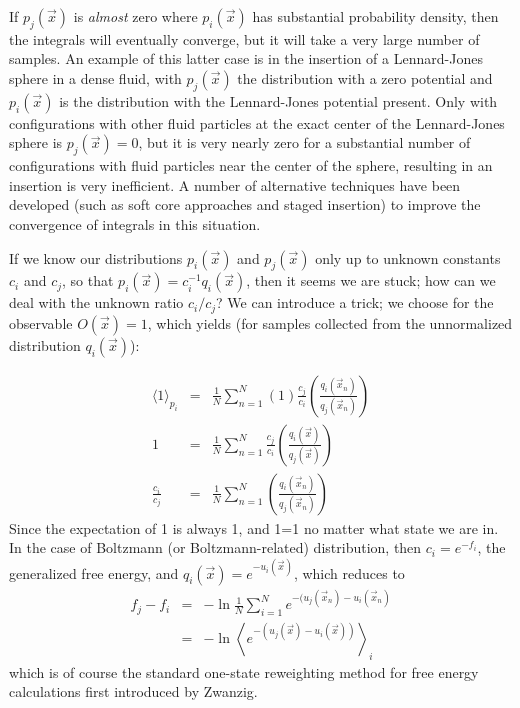 \documentclass[aps,pre,twocolumn,superscriptaddress]{revtex4-1}
\newcommand{\expect}[1]{\left \langle #1 \right \rangle} %
\begin{document}
If $p_j(\vec{x})$ is {\em almost} zero where
$p_i(\vec{x})$ has substantial probability density, then the integrals
will eventually converge, but it will take a very large number of
samples. An example of this latter case is in the insertion of a
Lennard-Jones sphere in a dense fluid, with $p_j(\vec{x})$ the
distribution with a zero potential and $p_i(\vec{x})$ is the
distribution with the Lennard-Jones potential present.  Only with
configurations with other fluid particles at the exact center of the
Lennard-Jones sphere is $p_j(\vec{x})=0$, but it is very nearly zero
for a substantial number of configurations with fluid particles near
the center of the sphere, resulting in an insertion is very
inefficient.  A number of alternative techniques have been developed
(such as soft core approaches and staged insertion) to improve the
convergence of integrals in this situation.


If we know our distributions $p_i(\vec{x})$ and $p_j(\vec{x})$ only up
to unknown constants $c_i$ and $c_j$, so that $p_i(\vec{x}) =
c_i^{-1}q_i(\vec{x})$, then it seems we are stuck; how can we deal
with the unknown ratio $c_i/c_j$? We can introduce a trick; we choose
for the observable $O(\vec{x})=1$, which yields (for samples collected
from the unnormalized distribution $q_i(\vec{x})$):

\begin{eqnarray}
\langle 1 \rangle_{p_i} &=& \frac{1}{N} \sum_{n=1}^{N} \left(1\right) \frac{c_j}{c_i} \left(\frac{q_i(\vec{x}_n)}{q_j(\vec{x}_n)}\right) \nonumber \\
        1  &=& \frac{1}{N} \sum_{n=1}^{N}\frac{c_j}{c_i} \left(\frac{q_i(\vec{x})}{q_j(\vec{x})}\right) \nonumber \\
       \frac{c_i}{c_j}  &=& \frac{1}{N} \sum_{n=1}^{N} \left(\frac{q_i(\vec{x}_n)}{q_j(\vec{x}_n)}\right)
\end{eqnarray}
Since the expectation of 1 is always 1, and 1=1 no matter what state
we are in. In the case of Boltzmann (or Boltzmann-related)
distribution, then $c_i = e^{-f_i}$, the generalized free energy, and
$q_i(\vec{x}) = e^{-u_i(\vec{x})}$, which reduces to
\begin{eqnarray}
f_j-f_i  &=& -\ln \frac{1}{N} \sum_{i=1}^N e^{-(u_j(\vec{x}_n)-u_i(\vec{x}_n)}  \nonumber \\
            &=& -\ln \expect{ e^{-(u_j(\vec{x})-u_i(\vec{x}))}}_{i}
\end{eqnarray}
which is of course the standard one-state reweighting method for free
energy calculations first introduced by Zwanzig.
\end{document}

